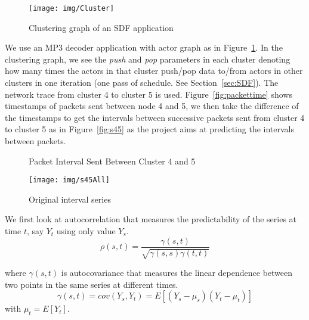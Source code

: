 \documentclass[12pt]{article}
\begin{document}
\begin{figure}[ht!]
\centering
\texttt{[image: img/Cluster]}
\caption{Clustering graph of an SDF application}\label{fig:Cluster}
\end{figure}

We use an MP3 decoder application with actor graph as in
Figure~\ref{fig:Cluster}. In the clustering graph, we see the \textit{push} and
\textit{pop} parameters in each cluster denoting how many times the actors in
that cluster push/pop data to/from actors in other clusters in one iteration
(one pass of schedule. See Section~\ref{sec:SDF}). The network trace from
cluster 4 to cluster 5 is used. Figure~\ref{fig:packettime} shows timestamps of
packets sent between node 4 and 5, we then take the difference of the timestamps to get the intervals between successive packets sent from cluster 4 to cluster 5
as in Figure~\ref{fig:s45} as the project aims at predicting the intervals between packets.

\begin{figure*}[ht!]
\centering
{}
\caption{Packet Interval Sent Between Cluster 4 and 5}
\end{figure*}

\begin{figure}[ht!]
\centering
\texttt{[image: img/s45All]}
\caption{Original interval series}\label{fig:s45All}
\end{figure}

We first look at autocorrelation that measures the predictability of the series
at time $t$, say $Y_t$ using only value $Y_s$.
\begin{equation}
\rho(s,t)=\frac{\gamma(s,t)}{\sqrt{\gamma(s,s)\gamma(t,t)}}
\end{equation}

where $\gamma(s,t)$ is autocovariance that measures the linear dependence
between two points in the same series at different times.
\begin{equation}
\gamma(s,t)=cov(Y_s, Y_t)=E[(Y_s-\mu_s)(Y_t-\mu_t)]
\end{equation}
with $\mu_t=E[Y_t]$.
\end{document}
